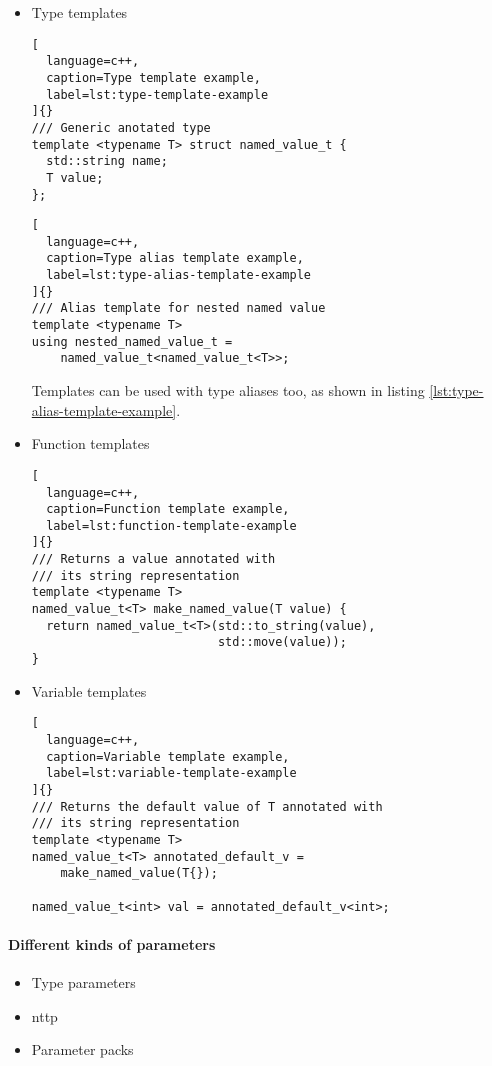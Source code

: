 \documentclass[../main]{subfiles}
\begin{document}
\begin{itemize}
\item Type templates

\begin{lstlisting}[
  language=c++,
  caption=Type template example,
  label=lst:type-template-example
]{}
/// Generic anotated type
template <typename T> struct named_value_t {
  std::string name;
  T value;
};
\end{lstlisting}

\begin{lstlisting}[
  language=c++,
  caption=Type alias template example,
  label=lst:type-alias-template-example
]{}
/// Alias template for nested named value
template <typename T>
using nested_named_value_t =
    named_value_t<named_value_t<T>>;
\end{lstlisting}

Templates can be used with type aliases too, as shown in
listing \ref{lst:type-alias-template-example}.

\item Function templates

\begin{lstlisting}[
  language=c++,
  caption=Function template example,
  label=lst:function-template-example
]{}
/// Returns a value annotated with
/// its string representation
template <typename T>
named_value_t<T> make_named_value(T value) {
  return named_value_t<T>(std::to_string(value),
                          std::move(value));
}
\end{lstlisting}

\item Variable templates

\begin{lstlisting}[
  language=c++,
  caption=Variable template example,
  label=lst:variable-template-example
]{}
/// Returns the default value of T annotated with
/// its string representation
template <typename T>
named_value_t<T> annotated_default_v =
    make_named_value(T{});

named_value_t<int> val = annotated_default_v<int>;
\end{lstlisting}

\end{itemize}

\paragraph{Different kinds of parameters}

\begin{itemize}
\item Type parameters
\item \gls{nttp}
\item Parameter packs
\end{itemize}
\end{document}
